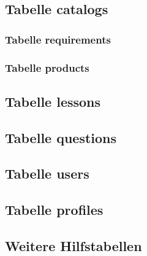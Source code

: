\subsection{Tabelle catalogs}
\subsubsection{Tabelle requirements}
\subsubsection{Tabelle products}
\subsection{Tabelle lessons}
\subsection{Tabelle questions}
\subsection{Tabelle users}
\subsection{Tabelle profiles}
\subsection{Weitere Hilfstabellen}
